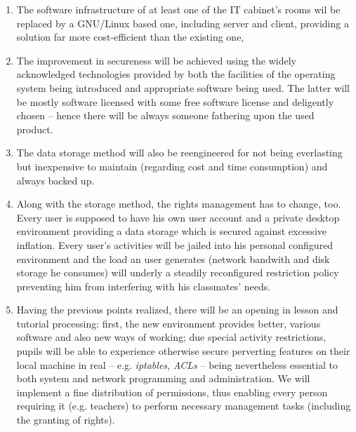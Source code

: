 \begin{enumerate}
 \item The software infrastructure of at least one of the IT cabinet's rooms wil be replaced by a GNU/Linux based one, including server and client, providing a solution far more cost-efficient than the existing one,
 \item The improvement in secureness will be achieved using the widely acknowledged technologies provided by both the facilities of the operating system being introduced and appropriate software being used. The latter will be mostly software licensed with some free software license and deligently chosen -- hence there will be always someone fathering upon the used product.
 \item The data storage method will also be reengineered for not being everlasting but inexpensive to maintain (regarding cost and time consumption) and always backed up.
 \item Along with the storage method, the rights management has to change, too. Every user is supposed to have his own user account and a private desktop environment providing a data storage which is secured against excessive inflation. Every user's activities will be jailed into his personal configured environment and the load an user generates (network bandwith and disk storage he consumes) will underly a steadily reconfigured restriction policy preventing him from interfering with his classmates' needs.
 \item Having the previous points realized, there will be an opening in lesson and tutorial processing: first, the new environment provides better, various software and also new ways of working; due special activity restrictions, pupils will be able to experience otherwise secure perverting features on their local machine in real -- e.g. \emph{iptables}, \emph{ACLs} -- being nevertheless essential to both system and network programming and administration. We will implement a fine distribution of permissions, thus enabling every person requiring it (e.g. teachers) to perform necessary management tasks (including the granting of rights).
\end{enumerate}

